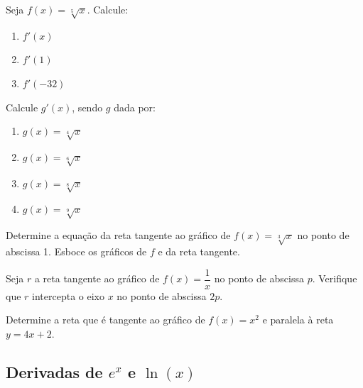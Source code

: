 \begin{exercicio}[5]
\label{ex:7.3.5}
Seja $f(x) = \sqrt[5]{x}$. Calcule:
\begin{enumerate}[label=\alph*)]
    \item $f'(x)$
    \item $f'(1)$
    \item $f'(-32)$
\end{enumerate}
\end{exercicio}

\begin{exercicio}[6]
\label{ex:7.3.6}
Calcule $g'(x)$, sendo $g$ dada por:
\begin{enumerate}[label=\alph*)]
    \item $g(x) = \sqrt[4]{x}$
    \item $g(x) = \sqrt[6]{x}$
    \item $g(x) = \sqrt[8]{x}$
    \item $g(x) = \sqrt[9]{x}$
\end{enumerate}
\end{exercicio}

\begin{exercicio}[7]
\label{ex:7.3.7}
Determine a equação da reta tangente ao gráfico de $f(x) = \sqrt[3]{x}$ no ponto de abscissa 1. Esboce os gráficos de $f$ e da reta tangente.
\end{exercicio}

\begin{exercicio}[8]
\label{ex:7.3.8}
Seja $r$ a reta tangente ao gráfico de $f(x) = \dfrac{1}{x}$ no ponto de abscissa $p$. Verifique que $r$ intercepta o eixo $x$ no ponto de abscissa $2p$.
\end{exercicio}

\begin{exercicio}[9]
\label{ex:7.3.9}
Determine a reta que é tangente ao gráfico de $f(x) = x^2$ e paralela à reta $y = 4x + 2$.
\end{exercicio}

\clearpage

\subsection{Derivadas de $e^x$ e $\ln(x)$}

